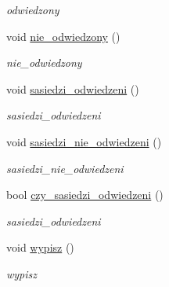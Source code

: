 \begin{DoxyCompactItemize}
\begin{DoxyCompactList}\small\item\em odwiedzony \end{DoxyCompactList}\item 
void \hyperlink{class_element_a1091b5a9763464470901903c27fa3af4}{nie\+\_\+odwiedzony} ()
\begin{DoxyCompactList}\small\item\em nie\+\_\+odwiedzony \end{DoxyCompactList}\item 
void \hyperlink{class_element_aea8ebe54afa2525740e1b065f9fd3a13}{sasiedzi\+\_\+odwiedzeni} ()
\begin{DoxyCompactList}\small\item\em sasiedzi\+\_\+odwiedzeni \end{DoxyCompactList}\item 
void \hyperlink{class_element_a04d9f1bebfc82dad1ca3e32e1f84fd5d}{sasiedzi\+\_\+nie\+\_\+odwiedzeni} ()
\begin{DoxyCompactList}\small\item\em sasiedzi\+\_\+nie\+\_\+odwiedzeni \end{DoxyCompactList}\item 
bool \hyperlink{class_element_a07619a03996d2a7261d78dea30319d7a}{czy\+\_\+sasiedzi\+\_\+odwiedzeni} ()
\begin{DoxyCompactList}\small\item\em sasiedzi\+\_\+odwiedzeni \end{DoxyCompactList}\item 
void \hyperlink{class_element_afd6003b54275449e8b67d34a842a87fc}{wypisz} ()
\begin{DoxyCompactList}\small\item\em wypisz \end{DoxyCompactList}\end{DoxyCompactItemize}
